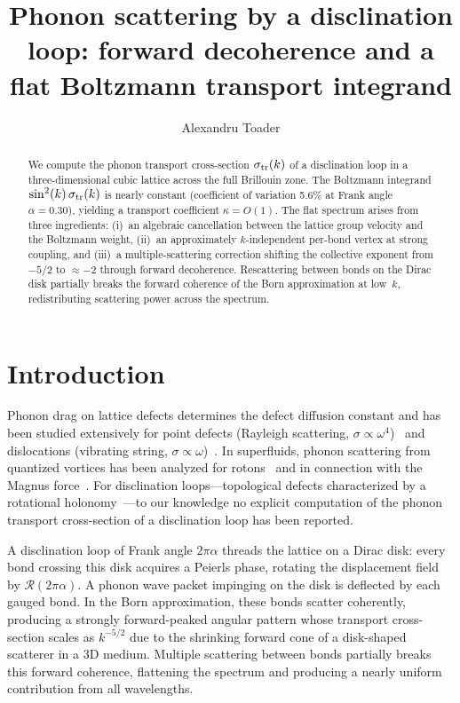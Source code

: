 \documentclass[aps,prl,twocolumn,superscriptaddress]{revtex4-2}
\begin{document}
\title{Phonon scattering by a disclination loop: forward decoherence
and a flat Boltzmann transport integrand}

\author{Alexandru Toader}

\begin{abstract}
We compute the phonon transport cross-section $\sigma_{\rm tr}(k)$ of a
disclination loop in a three-dimensional cubic lattice across the full
Brillouin zone. The Boltzmann integrand $\sin^2(k)\,\sigma_{\rm tr}(k)$
is nearly constant (coefficient of variation 5.6\% at Frank angle
$\alpha = 0.30$), yielding a transport coefficient $\kappa = O(1)$.
The flat spectrum arises from three ingredients:
(i)~an algebraic cancellation between the lattice group velocity and the
Boltzmann weight,
(ii)~an approximately $k$-independent per-bond vertex at strong coupling,
and (iii)~a multiple-scattering correction shifting the collective
exponent from $-5/2$ to $\approx -2$ through forward decoherence.
Rescattering between bonds on the Dirac disk partially breaks the forward
coherence of the Born approximation at low~$k$, redistributing scattering
power across the spectrum.
\end{abstract}

\maketitle

\section{Introduction}

Phonon drag on lattice defects determines the defect diffusion constant and
has been studied extensively for point defects (Rayleigh scattering,
$\sigma \propto \omega^4$)~\cite{ziman1960,klemens1958} and dislocations
(vibrating string, $\sigma \propto \omega$)~\cite{granato1956}. In
superfluids, phonon scattering from quantized vortices has been analyzed for
rotons~\cite{cleary1968} and in connection with the Magnus
force~\cite{sonin1997}. For disclination loops---topological defects
characterized by a rotational
holonomy~\cite{mermin1979,dewit1973}---to our knowledge no explicit
computation of the phonon transport cross-section of a disclination loop
has been reported.

A disclination loop of Frank angle $2\pi\alpha$ threads the lattice on a
Dirac disk: every bond crossing this disk acquires a Peierls phase, rotating
the displacement field by $\mathcal{R}(2\pi\alpha)$. A phonon wave packet
impinging on the disk is deflected by each gauged bond. In the Born
approximation, these bonds scatter coherently, producing a strongly
forward-peaked angular pattern whose transport cross-section scales as
$k^{-5/2}$ due to the shrinking forward cone of a disk-shaped scatterer in
a 3D medium. Multiple scattering between bonds partially breaks this forward
coherence, flattening the spectrum and producing a nearly uniform
contribution from all wavelengths.
\end{document}
